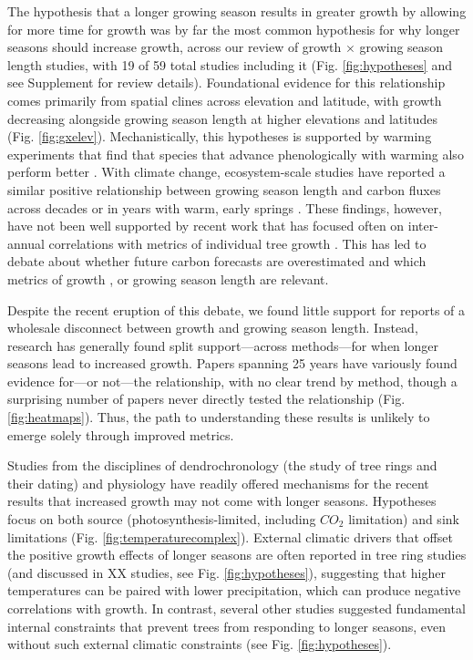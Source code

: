 \documentclass[11pt]{article}
\begin{document}
The hypothesis that a longer growing season results in greater growth by allowing for more time for growth was by far the most common hypothesis for why longer seasons should increase growth, across our review of growth $\times$ growing season length studies, with 19 of 59 total studies including it (Fig. \ref{fig:hypotheses} and see Supplement for review details). Foundational evidence for this relationship comes primarily from spatial clines across elevation and latitude, with growth decreasing alongside growing season length at higher elevations and latitudes (Fig. \ref{fig:gxelev}). Mechanistically, this hypotheses is supported by warming experiments that find that species that advance phenologically with warming also perform better \citep[with performance most often measured by growth,][]{Cleland:2012}. With climate change, ecosystem-scale studies have reported a similar positive relationship between growing season length and carbon fluxes across decades \citep{keenan2014net} or in years with warm, early springs \citep{chen1999effects}. These findings, however, have not been well supported by recent work that has focused often on inter-annual correlations with metrics of individual tree growth \citep{dow2022warm,silvestro2023longer}. This has led to debate about whether future carbon forecasts are overestimated and which metrics of growth \citep{green2022limits}, or growing season length \citep{korner2023four} are relevant.

Despite the recent eruption of this debate, we found little support for reports of a wholesale disconnect between growth and growing season length. Instead, research has generally found split support---across methods---for when longer seasons lead to increased growth. Papers spanning 25 years have variously found evidence for---or not---the relationship, with no clear trend by method, though a surprising number of papers never directly tested the relationship (Fig. \ref{fig:heatmaps}). Thus, the path to understanding these results is unlikely to emerge solely through improved metrics. 

Studies from the disciplines of dendrochronology (the study of tree rings and their dating) and physiology have readily offered mechanisms for the recent results that increased growth may not come with longer seasons. Hypotheses focus on both source (photosynthesis-limited, including $CO_2$ limitation) and sink limitations (Fig. \ref{fig:temperaturecomplex}). External climatic drivers that offset the positive growth effects of longer seasons are often reported in tree ring studies (and discussed in XX studies, see Fig. \ref{fig:hypotheses}), suggesting that higher temperatures can be paired with lower precipitation, which can produce negative correlations with growth. In contrast, several other studies suggested fundamental internal constraints that prevent trees from responding to longer seasons, even without such external climatic constraints (see Fig. \ref{fig:hypotheses}). 
\end{document}
